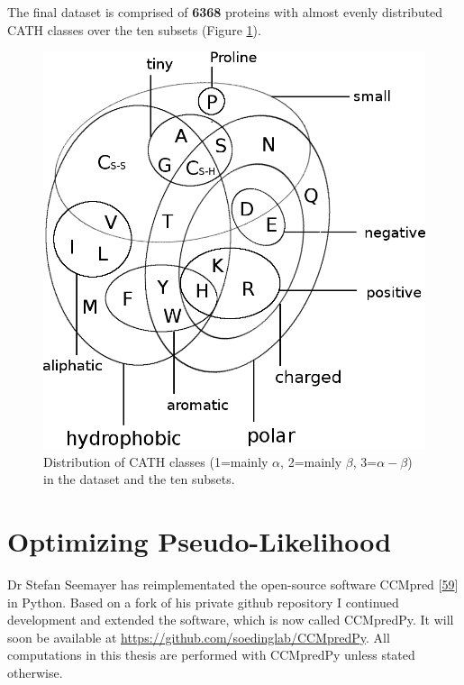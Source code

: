 \documentclass[12pt,a4paper,twoside]{book}
\theoremstyle{definition}
\theoremstyle{definition}
\theoremstyle{remark}
\begin{document}
The final dataset is comprised of \textbf{6368} proteins with almost
evenly distributed CATH classes over the ten subsets (Figure
\ref{fig:dataset-cath-topologies}).





\begin{figure}
\includegraphics[width=1\linewidth]{img/amino_acid_physico_chemical_properties_venn_diagramm} \caption{Distribution of CATH classes
(1=mainly \(\alpha\), 2=mainly \(\beta\), 3=\(\alpha-\beta\)) in the
dataset and the ten subsets. }\label{fig:dataset-cath-topologies}
\end{figure}

\section{Optimizing
Pseudo-Likelihood}\label{optimizing-pseudo-likelihood}

Dr Stefan Seemayer has reimplementated the open-source software CCMpred
{[}\protect\hyperlink{ref-Seemayer2014}{59}{]} in Python. Based on a
fork of his private github repository I continued development and
extended the software, which is now called CCMpredPy. It will soon be
available at \url{https://github.com/soedinglab/CCMpredPy}. All
computations in this thesis are performed with CCMpredPy unless stated
otherwise.
\end{document}
